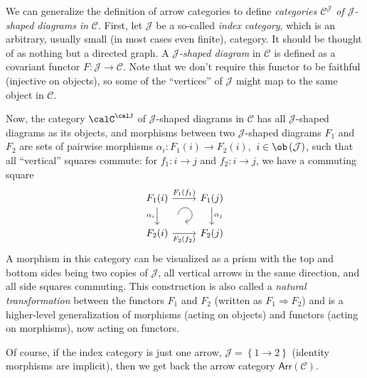 \begin{defn}\label{categories of diagrams}
    We can generalize the definition of arrow categories to define \emph{categories
    $\mathcal{C}^\mathcal{J}$ of $\mathcal{J}$-shaped
    diagrams in} $\mathcal{C}$. First, let $\mathcal{J}$ be a so-called \emph{index
    category}, which is an arbitrary, usually small (in most cases even finite), category.
    It should be thought of as nothing but a directed graph. A \emph{$\mathcal{J}$-shaped
    diagram} in $\mathcal{C}$ is defined as a covariant functor $F:\mathcal{J}\to\mathcal{C}$.
    Note that we don't require this functor to be faithful (injective
    on objects), so some of the ``vertices'' of $\mathcal{J}$ might
    map to the same object in $\mathcal{C}$.

    Now, the category $\calC^\calJ$ of $\mathcal{J}$-shaped diagrams in $\mathcal{C}$
    has all $\mathcal{J}$-shaped diagrams as its objects, and morphisms
    between two $\mathcal{J}$-shaped diagrams $F_{1}$ and $F_{2}$ are
    sets of pairwise morphisms $\alpha_{i}:F_{1}\left(i\right)\to F_{2}\left(i\right),$
    $i\in\ob\left(\mathcal{J}\right)$, such that all ``vertical'' squares
    commute: for $f_{1}:i\to j$ and $f_{2}:i\to j$, we have a commuting
    square
    \[\begin{tikzcd}[every matrix/.append style={name=m},   
    execute at end picture={\draw [<-] ([xshift=-2.7em,yshift=.3em]m-2-2.north) arc[start angle=-90,delta angle=270,radius=0.25cm];}]
    F_1(i)\arrow[r,"F_1(f_1)" ]\arrow[d,swap,"\alpha_i" ]& F_1(j) \arrow[d,"\alpha_j" ] \\
    F_2(i)\arrow[r,swap,"F_2(f_2)" ]& F_2(j)
    \end{tikzcd}\]
    A morphism in this category can be visualized as a prism with the
    top and bottom sides being two copies of $\mathcal{J}$, all vertical
    arrows in the same direction, and all side squares commuting. This
    construction is also called a \emph{natural transformation} between
    the functors $F_{1}$ and $F_{2}$ (written as $F_{1}\Longrightarrow F_{2}$)
    and is a higher-level generalization of morphisms (acting on objects)
    and functors (acting on morphisms), now acting on functors.

    Of course, if the index category is just one arrow, $\mathcal{J}=\left\{ 1\to2\right\} $
    (identity morphisms are implicit), then we get back the arrow category
    $\mathsf{Arr}\left(\mathcal{C}\right)$.
\end{defn}
